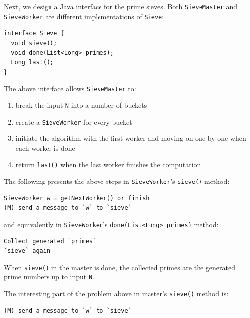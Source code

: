 Next, we design a Java interface for the prime sieves. Both
\lstinline!SieveMaster! and \lstinline!SieveWorker! are different
implementations of
\href{https://github.com/CrispOSS/prime-sieves/blob/master/src/main/java/com/github/crisposs/sieves/Sieve.java}{\lstinline!Sieve!}:

\lstset{language=Java}
\begin{lstlisting}[caption=Sieve Actor]
interface Sieve {
  void sieve();
  void done(List<Long> primes);
  Long last();
}
\end{lstlisting}

The above interface allows \lstinline!SieveMaster! to:

\begin{enumerate}
\itemsep1pt\parskip0pt
\item
  break the input \lstinline!N! into a number of buckets\\
\item
  create a \lstinline!SieveWorker! for every bucket\\
\item
  initiate the algorithm with the first worker and moving on one by one
  when each worker is done\\
\item
  return \lstinline!last()! when the last worker finishes the
  computation
\end{enumerate}

The following presents the above steps in \lstinline!SieveWorker!'s
\lstinline!sieve()! method:

\begin{lstlisting}
SieveWorker w = getNextWorker() or finish
(M) send a message to `w` to `sieve`
\end{lstlisting}

and equivalently in \lstinline!SieveWorker!'s
\lstinline!done(List<Long> primes)! method:

\begin{lstlisting}
Collect generated `primes`
`sieve` again
\end{lstlisting}

When \lstinline!sieve()! in the master is done, the collected primes are
the generated prime numbers up to input \lstinline!N!.

The interesting part of the problem above in master's
\lstinline!sieve()! method is:

\begin{lstlisting}
(M) send a message to `w` to `sieve`
\end{lstlisting}

